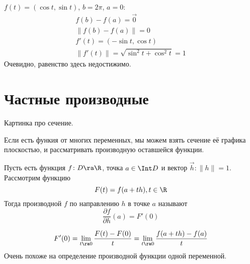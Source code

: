 \begin{exmp}
	$f(t) = (\cos t, \sin t)$, $b = 2\pi$, $a = 0$:
	\begin{gather*}
		f(b) - f(a) = \vec 0 \\
		\| f(b) - f(a) \| = 0 \\
		f'(t) = (-\sin t, \cos t) \\
		\| f'(t) \| = \sqrt{\sin^2 t + \cos^2 t} = 1
	\end{gather*}
	Очевидно, равенство здесь недостижимо.
\end{exmp}

\section{Частные производные}

Картинка про сечение.

Если есть функия от многих переменных, мы можем взять сечение её графика плоскостью,
и рассматривать производную оставшейся функции.

\begin{Def}
	Пусть есть функция $f\colon D \ra \R$, точка $a \in \Int D$ и вектор $\vec h\colon \|h\| = 1$.
	Рассмотрим функцию
	\[ F(t) = f(a + th), t \in \R \]
	Тогда производной $f$ по направлению $h$ в точке $a$ называют
	\[ \frac{\partial f}{\partial h}(a) = F'(0) \]
\end{Def}

\begin{Rem}
	\[ F'(0) = \lim_{t \ra 0} \frac{F(t) - F(0)}t = \lim_{t \ra 0} \frac{f(a + th) - f(a)}t \]
	Очень похоже на определение производной функции одной переменной.
\end{Rem}

